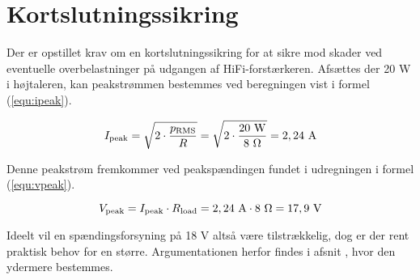 \section{Kortslutningssikring}
\label{valg_kortslutningssikring}
Der er opstillet krav om en kortslutningssikring for at sikre mod skader ved eventuelle overbelastninger på udgangen af HiFi-forstærkeren. Afsættes der 20 W i højtaleren, kan peakstrømmen bestemmes ved beregningen vist i formel (\ref{equ:ipeak}).

\begin{equation}
\label{equ:ipeak}
I_{\mathrm{peak}} = \sqrt{2 \cdot \frac{p_{\mathrm{RMS}}}{R}} = \sqrt{2 \cdot \frac{\mathrm{20~W}}{8~\ohm}}  = \mathrm{2,24~A}
\end{equation}

Denne peakstrøm fremkommer ved peakspændingen fundet i udregningen i formel (\ref{equ:vpeak}).

\begin{equation}
\label{equ:vpeak}
V_{\mathrm{peak}} = I_{\mathrm{peak}} \cdot R_{\mathrm{load}} = \mathrm{2,24~A \cdot 8~\ohm = 17,9~V}
\end{equation}

Ideelt vil en spændingsforsyning på 18 V altså være tilstrækkelig, dog er der rent praktisk behov for en større. Argumentationen herfor findes i afsnit , hvor den ydermere bestemmes.